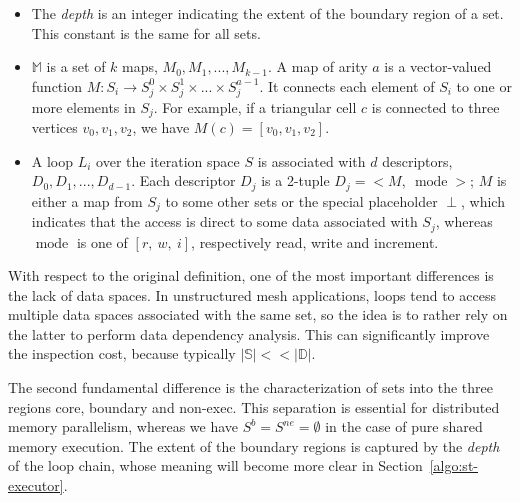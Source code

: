 \begin{itemize}
\item The {\em depth} is an integer indicating the extent of the boundary region of a set. This constant is the same for all sets. 

\item $\mathbb{M}$ is a set of $k$ maps, $M_0, M_1, ..., M_{k-1}$. A map of arity $a$ is a vector-valued function $M : S_i \rightarrow S_j^0 \times S_j^1 \times ... \times S_j^{a-1}$. It connects each element of $S_i$ to one or more elements in $S_j$. For example, if a triangular cell $c$ is connected to three vertices $v_0, v_1, v_2$, we have $M(c) = [v_0, v_1, v_2]$. 

\item A loop $L_i$ over the iteration space $S$ is associated with $d$ descriptors, $D_0, D_1, ..., D_{d-1}$. Each descriptor $D_j$ is a 2-tuple $D_j = {<}M,\ \operatorname{mode}{>}$; $M$ is either a map from $S_j$ to some other sets or the special placeholder $\perp$, which indicates that the access is direct to some data associated with $S_j$, whereas $\operatorname{mode}$ is one of $[r,\ w,\ i]$, respectively read, write and increment.
\end{itemize}

With respect to the original definition, one of the most important differences is the lack of data spaces. In unstructured mesh applications, loops tend to access multiple data spaces associated with the same set, so the idea is to rather rely on the latter to perform data dependency analysis. This can significantly improve the inspection cost, because typically $|\mathbb{S}| << |\mathbb{D}|$. 

The second fundamental difference is the characterization of sets into the three regions core, boundary and non-exec. This separation is essential for distributed memory parallelism, whereas we have  $S^{b} = S^{ne} = \emptyset$ in the case of pure shared memory execution. The extent of the boundary regions is captured by the {\em depth} of the loop chain, whose meaning will become more clear in Section~\ref{algo:st-executor}. 

